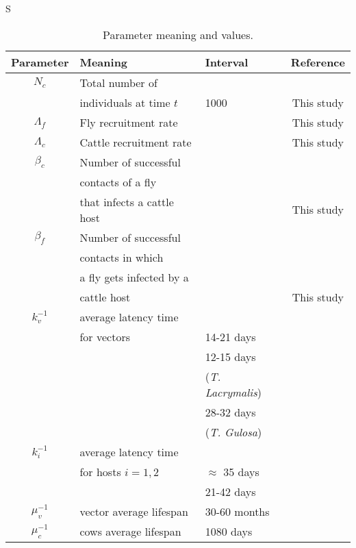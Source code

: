 S\documentclass[preprint,12pt]{elsarticle}
\begin{document}
\begin{table}[htb]
	\begin{center}
        \begin{tabular}{cllc}
			\hline
			Parameter		&	Meaning & Interval & Reference
			\\
			\midrule
			$N_c$& Total number of &&\\
			&individuals at time $t$ &1000&This study
			\\
			$\Lambda_f$& Fly recruitment rate & & This study
			\\
			$\Lambda_c$& Cattle recruitment rate & & This study
			\\			
			$\beta_c$& Number of successful &&\\
			&contacts of a fly &&
				\\
			& that infects a cattle host &&This study
				\\
			$\beta_f$& Number of successful&&\\
			&contacts in which &&
				\\
			& a fly gets infected by a &&\\
			&cattle host &&This study
				\\
			$k_v^{-1}$	& average latency time &&\\
			&for vectors & 14-21 days &\cite{Otranto:bookchapter}
			\\
				& & 12-15 days &\\
				&&(\textit{T. Lacrymalis}) &\cite{Chanie:2014}
			\\
				& & 28-32 days&\\ 
				&&(\textit{T. Gulosa}) &\cite{Chanie:2014}
			\\
			$k_{i}^{-1}$
			&
				average latency time &&\\
				&for hosts $i=1,2$ & $\approx$ 35 days& \cite{Otranto:bookchapter}
			\\
			& & 21-42 days& \cite{Chanie:2014}
			\\			
			 $\mu_v^{-1}$	& vector average lifespan & 30-60 months&\cite{sanchez:1998}
			\\
			$\mu_c^{-1}$
			&
				cows average lifespan & 1080 days& \cite{FAOweb}
			\\
    		\bottomrule
		\end{tabular}
	\end{center}
	\caption{
		Parameter meaning and values.}
    \label{Table:Parameters}
\end{table}
\end{document}
